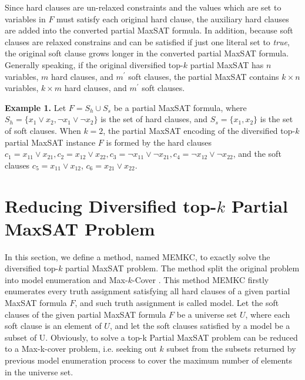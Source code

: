 \documentclass{llncs}
\begin{document}
Since hard clauses are un-relaxed constraints and the values which are set to variables in $F$ must satisfy each original hard clause, the auxiliary hard clauses are added into the converted partial MaxSAT formula. In addition, because soft clauses are relaxed constrains and can be satisfied if just one literal set to {\it true}, the original soft clause grows longer in the converted partial MaxSAT formula. Generally speaking, if the original diversified top-$k$ partial MaxSAT has $n$ variables, $m$ hard clauses, and $m^{'}$ soft clauses, the partial MaxSAT contains $k\times n$ variables, $k\times m$ hard clauses, and $m^{'}$ soft clauses.

\medskip\noindent
{\bfseries Example 1.} Let $F=S_h \cup S_s$ be a partial MaxSAT formula, where $S_h=\{x_1\vee x_2, \neg x_1\vee \neg x_2\}$ is the set of hard clauses, and $S_s=\{x_1, x_2\}$ is the set of soft clauses. When $k=2$, the partial MaxSAT encoding of the diversified top-$k$ partial MaxSAT instance $F$ is formed by the hard clauses $c_1= x_{11} \vee x_{21}, c_2= x_{12}\vee x_{22}, c_3=\neg x_{11}\vee \neg x_{21}, c_4=\neg x_{12} \vee \neg x_{22}$, and the soft clauses $c_5=x_{11}\vee x_{12}$, $c_6=x_{21}\vee x_{22}$.



\section{Reducing Diversified top-$k$ Partial MaxSAT Problem} %
In this section, we define a method, named MEMKC, to exactly solve the diversified top-$k$ partial MaxSAT problem. The method split the original problem into model enumeration \cite{Morgado2005} and Max-$k$-Cover \cite{Chang2013}. This method MEMKC firstly enumerates every truth assignment satisfying all hard clauses of a given partial MaxSAT formula $F$, and such truth assignment is called model. Let the soft clauses of the given partial MaxSAT formula $F$ be a universe set $U$, where each soft clause is an element of $U$, and let the soft clauses satisfied by a model be a subset of U. Obviously, to solve a top-k Partial MaxSAT problem can be reduced to a Max-k-cover problem, i.e. seeking out $k$ subset from the subsets returned by previous model enumeration process to cover the maximum number of elements in the universe set.
\end{document}
